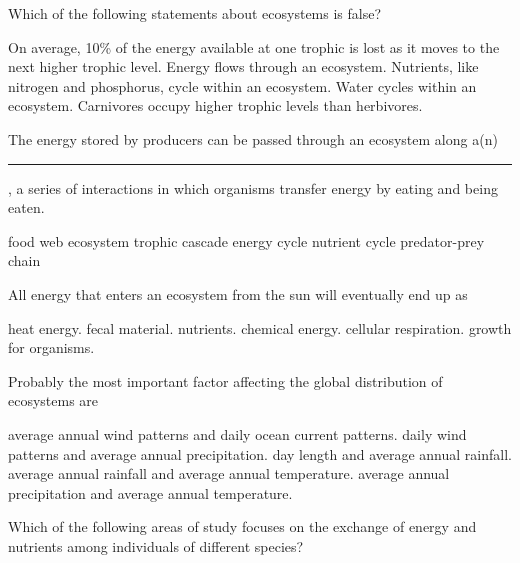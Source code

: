 \question
Which of the following statements about ecosystems is false?

\begin{choices}
\correctchoice On average, 10\% of the energy available at one trophic is lost as it moves to the next higher trophic level. %
\choice Energy flows through an ecosystem. %
\choice Nutrients, like nitrogen and phosphorus, cycle within an ecosystem. %
\choice Water cycles within an ecosystem. %
\choice Carnivores occupy higher trophic levels than herbivores. %
\end{choices}


\question
The energy stored by producers can be passed through an ecosystem along a(n) \rule{1in}{0.4pt}, a series of interactions in which organisms transfer energy by eating and being eaten.

\begin{choices}
\correctchoice food web %
\choice ecosystem %
\choice trophic cascade %
\choice energy cycle %
\choice nutrient cycle %
\choice predator-prey chain  %
\end{choices}



\question
All energy that enters an ecosystem from the sun will eventually end up as

\begin{choices}
\correctchoice heat energy. %
\choice fecal material. %
\choice nutrients. %
\choice chemical energy. %
\choice cellular respiration. %
\choice growth for organisms. %
\end{choices}

\question
Probably the most important factor affecting the global distribution of ecosystems are

\begin{choices}
\choice average annual wind patterns and daily ocean current patterns. %
\choice daily wind patterns and average annual precipitation. %
\choice day length and average annual rainfall. %
\choice average annual rainfall and average annual temperature. %
\correctchoice average annual precipitation and average annual temperature. %
\end{choices}


\question
Which of the following areas of study focuses on the exchange of energy and nutrients among individuals of different species?

